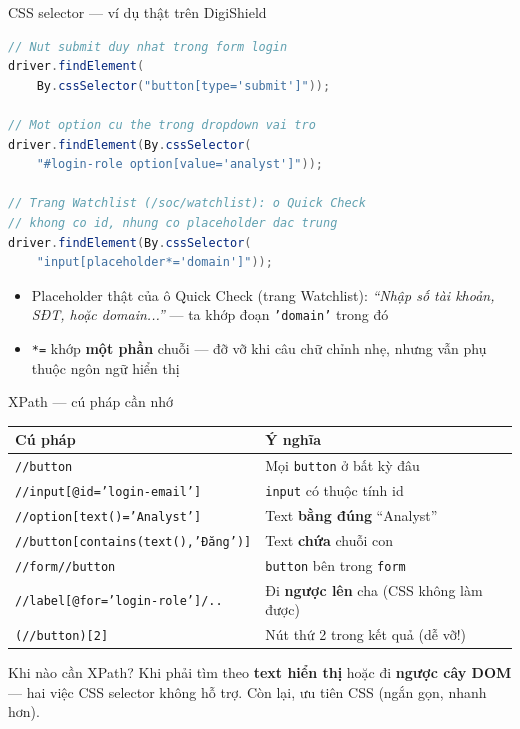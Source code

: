 \documentclass[aspectratio=169,12pt]{beamer}
\begin{document}
\begin{frame}[fragile]{CSS selector --- ví dụ thật trên DigiShield}
\begin{lstlisting}[language=java]
// Nut submit duy nhat trong form login
driver.findElement(
    By.cssSelector("button[type='submit']"));

// Mot option cu the trong dropdown vai tro
driver.findElement(By.cssSelector(
    "#login-role option[value='analyst']"));

// Trang Watchlist (/soc/watchlist): o Quick Check
// khong co id, nhung co placeholder dac trung
driver.findElement(By.cssSelector(
    "input[placeholder*='domain']"));
\end{lstlisting}

  \begin{itemize}
    \item Placeholder thật của ô Quick Check (trang Watchlist):
          \emph{``Nhập số tài khoản, SĐT, hoặc domain...''} --- ta khớp
          đoạn \texttt{'domain'} trong đó
    \item \texttt{*=} khớp \textbf{một phần} chuỗi --- đỡ vỡ khi câu chữ chỉnh nhẹ,
          nhưng vẫn phụ thuộc ngôn ngữ hiển thị
  \end{itemize}
\end{frame}

\begin{frame}{XPath --- cú pháp cần nhớ}
  \begin{center}
  \small
  \setlength{\tabcolsep}{4pt}
  \begin{tabular}{p{7.7cm}p{5.6cm}}
    \toprule
    \textbf{Cú pháp} & \textbf{Ý nghĩa} \\
    \midrule
    \texttt{//button} & Mọi \texttt{button} ở bất kỳ đâu \\
    \texttt{//input[@id='login-email']} & \texttt{input} có thuộc tính id \\
    \texttt{//option[text()='Analyst']} & Text \textbf{bằng đúng} ``Analyst'' \\
    \texttt{//button[contains(text(),'Đăng')]} & Text \textbf{chứa} chuỗi con \\
    \texttt{//form//button} & \texttt{button} bên trong \texttt{form} \\
    \texttt{//label[@for='login-role']/..} & Đi \textbf{ngược lên} cha (CSS không làm được) \\
    \texttt{(//button)[2]} & Nút thứ 2 trong kết quả (dễ vỡ!) \\
    \bottomrule
  \end{tabular}
  \end{center}

  \begin{block}{Khi nào cần XPath?}
    Khi phải tìm theo \textbf{text hiển thị} hoặc đi \textbf{ngược cây DOM} ---
    hai việc CSS selector không hỗ trợ. Còn lại, ưu tiên CSS (ngắn gọn, nhanh hơn).
  \end{block}
\end{frame}
\end{document}
